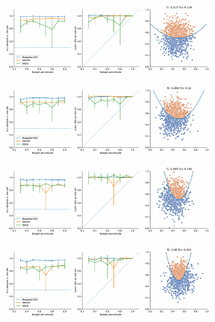 \begin{appendices}
\begin{figure}[b!]
\centering
    \begin{subfigure}{.8\textwidth}
        \centering
        \includegraphics[width=\textwidth]{img/comp_old/1.pdf}
    \end{subfigure}%
    \hfill
    \begin{subfigure}{.8\textwidth}
        \centering
        \includegraphics[width=\textwidth]{img/comp_old/2.pdf}
    \end{subfigure}
    \hfill
    \begin{subfigure}{.8\textwidth}
        \centering
        \includegraphics[width=\textwidth]{img/comp_old/4.pdf}
    \end{subfigure}
    \hfill
    \begin{subfigure}{.8\textwidth}
        \centering
        \includegraphics[width=\textwidth]{img/comp_old/5.pdf}

\end{subfigure}
\end{figure}
\end{appendices}
